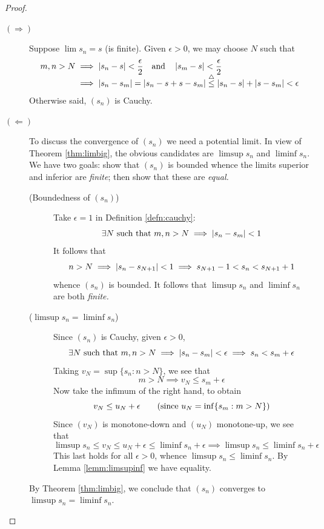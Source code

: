 \begin{proof}
	\begin{description}
		\item[$(\Rightarrow)$] Suppose $\lim s_n=s$ (is finite). Given $\epsilon>0$, we may choose $N$ such that
		\begin{align*}
			m,n>N&\implies \left| s_n-s\right|<\frac\epsilon 2
			\quad\text{and}\quad
			\left| s_m-s\right|<\frac\epsilon 2\\
			&\implies\left| s_n-s_m\right|=\left| s_n-s+s-s_m\right|
			\overset{\smash{\triangle}}{\le}
			\left| s_n-s\right|+\left| s-s_m\right|<\epsilon
		\end{align*}
		Otherwise said, $(s_n)$ is Cauchy.
		
		\item[$(\Leftarrow)$] To discuss the convergence of $(s_n)$ we need a potential limit. In view of Theorem \ref{thm:limbig}, the obvious candidates are $\limsup s_n$ and $\liminf s_n$. We have two goals: show that $(s_n)$ is bounded whence the limits superior and inferior are \emph{finite}; then show that these are \emph{equal.}
		\begin{description}
			\item[\normalfont(Boundedness of $(s_n)$)] Take $\epsilon=1$ in Definition \ref{defn:cauchy}:
			\[
				\exists N\text{ such that }m,n>N\implies\left| s_n-s_m\right|<1
			\]
			It follows that
			\[
				n>N\implies\left| s_n-s_{N+1}\right|<1\implies s_{N+1}-1<s_n<s_{N+1}+1
			\]
			whence $(s_n)$ is bounded. It follows that $\limsup s_n$ and $\liminf s_n$ are both \emph{finite.}
			
			\goodbreak
			
			\item[\normalfont($\limsup s_n=\liminf s_n$)] Since $(s_n)$ is Cauchy, given $\epsilon>0$,
			\[
				\exists N\text{ such that }m,n>N\implies \left| s_n-s_m\right|<\epsilon\implies s_n<s_m+\epsilon
			\]
			Taking $v_N=\sup\{s_n:n>N\}$, we see that
			\[
				m>N\implies v_N\le s_m+\epsilon
			\]
			Now take the infimum of the right hand, to obtain
			\[
				v_N\le u_N+\epsilon \tag{since $u_N=\inf\{s_m:m>N\}$}
			\]
			Since $(v_N)$ is monotone-down and $(u_N)$ monotone-up, we see that
			\[
				\limsup s_n\le v_N\le u_N+\epsilon\le\liminf s_n+\epsilon \implies \limsup s_n\le \liminf s_n+\epsilon 
			\]
			This last holds for all $\epsilon>0$, whence $\limsup s_n\le \liminf s_n$. By Lemma \ref{lemm:limsupinf} we have equality.
		\end{description}

		By Theorem \ref{thm:limbig}, we conclude that $(s_n)$ converges to $\limsup s_n=\liminf s_n$.\qedhere
	\end{description}
\end{proof}


